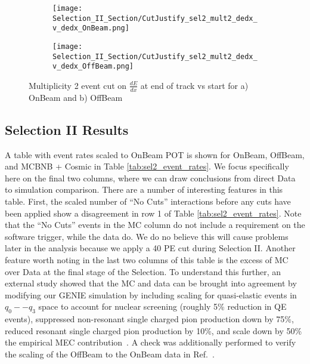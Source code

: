 \begin{figure}[h!]
\centering
\begin{subfigure}[t]{0.25\textwidth}
    \centering
\texttt{[image: Selection\_II\_Section/CutJustify\_sel2\_mult2\_dedx\_v\_dedx\_OnBeam.png]}
    \caption{ }
  \end{subfigure} 
  \hspace{1mm}
  \begin{subfigure}[t]{0.25\textwidth}
    \centering
    \texttt{[image: Selection\_II\_Section/CutJustify\_sel2\_mult2\_dedx\_v\_dedx\_OffBeam.png]}
    \caption{ }
  \end{subfigure} 

\caption{ Multiplicity 2 event cut on $\frac{dE}{dx}$ at end of track vs start for a) OnBeam and b) OffBeam }
\label{fig:cutjust_sel2_onbeam_mult2_dedx_v_dedx}
\end{figure}

\clearpage
\subsection{Selection II Results}
\par A table with event rates scaled to OnBeam POT is shown for OnBeam, OffBeam, and MCBNB + Cosmic in Table \ref{tab:sel2_event_rates}. We focus specifically here on the final two columns, where we can draw conclusions from direct Data to simulation comparison. There are a number of interesting features in this table.  First, the scaled number of ``No Cuts'' interactions before any cuts have been applied show a disagreement in row 1 of Table \ref{tab:sel2_event_rates}.  Note that the ``No Cuts'' events in the MC column do not include a requirement on the software trigger, while the data do.  We do no believe this will cause problems later in the analysis because we apply a 40 PE cut during Selection II.  Another feature worth noting in the last two columns of this table is the excess of MC over Data at the final stage of the Selection. To understand this further, an external study showed that the MC and data can be brought into agreement by modifying our GENIE simulation by including scaling for quasi-elastic events in $q_0 -- q_3$ space to account for nuclear screening (roughly 5\% reduction in QE events), suppressed non-resonant single charged pion production down by 75\%, reduced resonant single charged pion production by 10\%, and scale down by 50\% the empirical MEC contribution~\cite{bib:jaz_datamc_agreement}.  A check was additionally performed to verify the scaling of the OffBeam to the OnBeam data in Ref.~\cite{bib:davidcpot}. 

